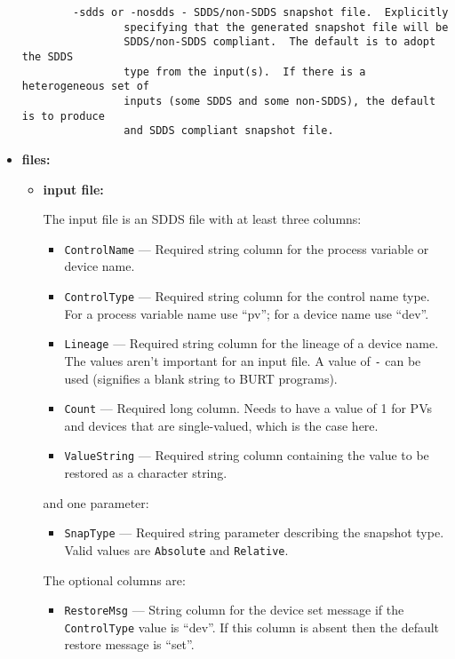 \begin{itemize}
\begin{verbatim}
        -sdds or -nosdds - SDDS/non-SDDS snapshot file.  Explicitly
                specifying that the generated snapshot file will be 
                SDDS/non-SDDS compliant.  The default is to adopt the SDDS
                type from the input(s).  If there is a heterogeneous set of
                inputs (some SDDS and some non-SDDS), the default is to produce
                and SDDS compliant snapshot file.
\end{verbatim}
\item {\bf files:}
\begin{itemize}
\item {\bf input file:} \par
The input file is an SDDS file with at least three columns:
\begin{itemize}
        \item {\tt ControlName} --- Required string column for the process variable or device name.
        \item {\tt ControlType} --- Required string column for the control name type. For a 
                process variable name use ``pv''; for a device name use ``dev''.
        \item {\tt Lineage} --- Required string column for the lineage of a device name.
                The values aren't important for an input file. A value of \verb+-+ can be used (signifies
                a blank string to BURT programs).
        \item {\verb+Count+} --- Required long column. Needs to have a value of 1 for PVs and devices
                that are single-valued, which is the case here.
        \item {\tt ValueString} --- Required string column containing the value to be restored as a character string.
\end{itemize}
and one parameter:
\begin{itemize}
        \item {\verb+SnapType+} --- Required string parameter describing the snapshot type. Valid
                values are \verb+Absolute+ and \verb+Relative+.
\end{itemize}

The optional columns are:
\begin{itemize}
        \item {\tt RestoreMsg} --- String column for the device set message if the {\tt
                ControlType} value is ``dev''.  If this column is absent then the default
                restore message is ``set''.
\end{itemize}
\end{itemize}


\end{itemize}
